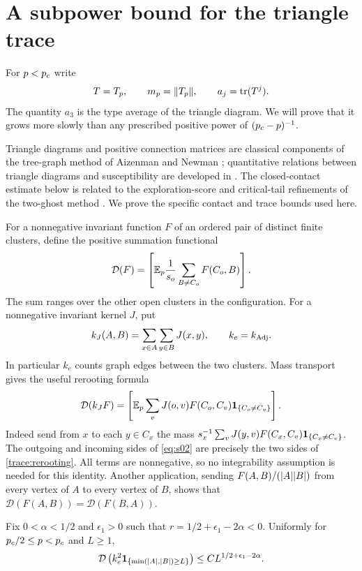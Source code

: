 \section{A subpower bound for the triangle trace}
\label{trace:section}

For $p<{p_c}$ write
\[
 T=T_p,\qquad m_p=\lVert T_p\rVert,\qquad a_j=\operatorname{tr}(T^j).
\]
The quantity $a_3$ is the type average of the triangle diagram.
We will prove that it grows more slowly than any prescribed
positive power of $({p_c}-p)^{-1}$.

Triangle diagrams and positive connection matrices are classical components of the
tree-graph method of Aizenman and Newman \cite{AizenmanNewman1984};
quantitative relations between triangle diagrams and susceptibility
are developed in \cite{Hutchcroft2022Triangle}. The closed-contact
estimate below is related to the exploration-score and critical-tail
refinements of the two-ghost method
\cite{Hutchcroft2020Locality,Hutchcroft2021PowerLaw}. We prove the
specific contact and trace bounds used here.

For a nonnegative invariant function $F$ of an ordered pair of
distinct finite clusters, define the positive summation functional
\[
 \mathcal D(F)=\left[\mathbb E_p\frac1{s_o}
                         \sum_{B\ne C_o}F(C_o,B)\right].
\]
The sum ranges over the other open clusters in the configuration.
For a nonnegative invariant kernel $J$, put
\[
 k_J(A,B)=\sum_{x\in A}\sum_{y\in B}J(x,y),
 \qquad k_e=k_{\operatorname{Adj}}.
\]
In particular $k_e$ counts graph edges between the two clusters.
Mass transport gives the useful rerooting formula
\begin{equation}
 \mathcal D(k_JF)=
 \left[\mathbb E_p\sum_v J(o,v)F(C_o,C_v)
                         \mathbf 1_{\{C_o\ne C_v\}}\right].
 \label{trace:rerooting}
\end{equation}
Indeed send from $x$ to each $y\in C_x$ the mass
$s_x^{-1}\sum_vJ(y,v)F(C_x,C_v)\mathbf 1_{\{C_x\ne C_v\}}$.
The outgoing and incoming sides of \eqref{eq:s02} are precisely
the two sides of \eqref{trace:rerooting}.  All terms are
nonnegative, so no integrability assumption is needed for this
identity.  Another application, sending
$F(A,B)/(\lvert A\rvert\lvert B\rvert)$ from every vertex of $A$ to every vertex
of $B$, shows that $\mathcal D(F(A,B))=\mathcal D(F(B,A))$.

\begin{lemma}
\label{trace:contact-tail}
Fix $0<\alpha<1/2$ and $\epsilon_1>0$ such that
$r=1/2+\epsilon_1-2\alpha<0$.  Uniformly for
${p_c}/2\le p<{p_c}$ and $L\ge1$,
\begin{equation}
 \mathcal D\left(k_e^2
            \mathbf 1_{\{\min(\lvert A\rvert,\lvert B\rvert)\ge L\}}\right)
       \le C L^{1/2+\epsilon_1-2\alpha}.
 \label{eq:s24}
\end{equation}
\end{lemma}

